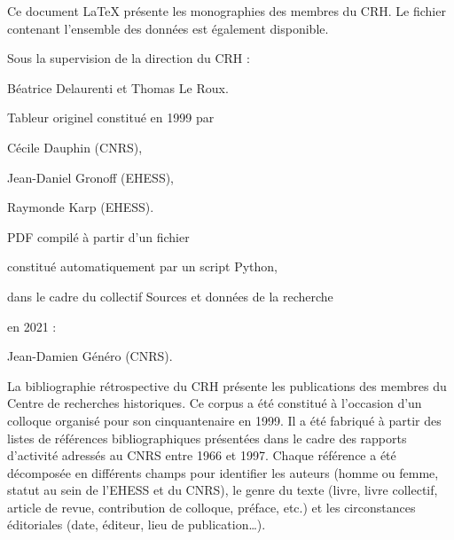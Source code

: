\documentclass{article}
\begin{document}

\newpage
\thispagestyle{empty}

\begin{center}
	\begin{itshape}
		
				Ce document \LaTeX{} présente les monographies des membres du CRH. Le fichier  contenant l'ensemble des données est également disponible.
		
		\bigskip
		
		Sous la supervision de la direction du CRH :
		
		Béatrice Delaurenti et Thomas Le Roux.
		
		\medskip
		
		Tableur originel constitué en 1999 par
		
		\medskip
		
		Cécile Dauphin (CNRS),
		
		Jean-Daniel Gronoff (EHESS),
		
		Raymonde Karp (EHESS).
		
		\bigskip
		
		PDF compilé à partir d'un fichier 
		
		constitué automatiquement par un script Python,
		
		dans le cadre du collectif \og Sources et données de la recherche \fg
		
		en 2021 :
		
		\medskip
		
		Jean-Damien Généro (CNRS).
		
		\bigskip
		
		La bibliographie rétrospective du CRH présente les publications des membres du Centre de recherches historiques. Ce corpus a été constitué à l’occasion d’un colloque organisé pour son cinquantenaire en 1999. Il a été fabriqué à partir des listes de références bibliographiques présentées dans le cadre des rapports d’activité adressés au CNRS entre 1966 et 1997. Chaque référence a été décomposée en différents champs pour identifier les auteurs (homme ou femme, statut au sein de l’EHESS et du CNRS), le genre du texte (livre, livre collectif, article de revue, contribution de colloque, préface, etc.) et les circonstances éditoriales (date, éditeur, lieu de publication…). 
		
		\bigskip
		

\end{itshape}
\end{center}
\end{document}
